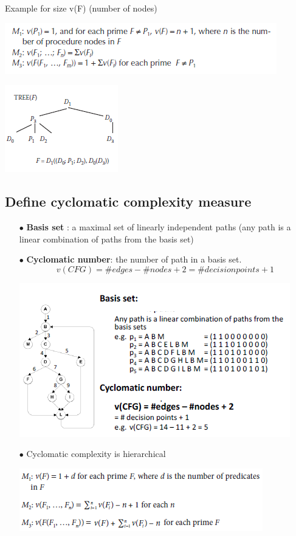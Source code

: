 \documentclass{article}
\begin{document}
\noindent Example for size v(F) (number of nodes)
\begin{multicols}{2}
\includegraphics[scale=0.8]{image/32.PNG}

\hspace{1cm}
\includegraphics[scale=0.7]{image/33.PNG}
\end{multicols}
\vspace{-1cm}
\subsection{Define cyclomatic complexity measure}
\begin{itemize}
    \item [$\bullet$]\textbf{Basis set} : a maximal set of linearly independent paths (any path is a linear combination of paths from the basis set)
    \item [$\bullet$]\textbf{Cyclomatic number}: the number of path in a basis set. \\
    $$v(CFG)= \#edges - \#nodes +2 = \#decision points+1$$
    \begin{center}
        \includegraphics[scale=0.6]{image/34.PNG}
    \end{center}
    \item[$\bullet$] Cyclomatic complexity is hierarchical
    \begin{center}
        \includegraphics[scale=0.8]{image/35.PNG}
\end{center}
\end{itemize}
\end{document}
